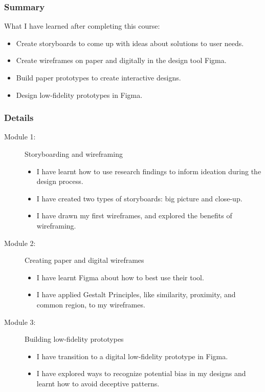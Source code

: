 \subsubsection{Summary}
\begin{flushleft}
	What I have learned after completing this course:
	\begin{itemize}
		\item Create storyboards to come up with ideas about solutions to user needs.
		\item Create wireframes on paper and digitally in the design tool Figma.
		\item Build paper prototypes to create interactive designs.
		\item Design low-fidelity prototypes in Figma.
	\end{itemize}
\end{flushleft}

\subsubsection{Details}
\begin{flushleft}
	\begin{description}
		\item[Module 1:] Storyboarding and wireframing
		      \begin{itemize}
			      \item I have learnt how to use research findings to inform ideation during the design process.
			      \item I have created two types of storyboards: big picture and close-up.
			      \item I have drawn my first wireframes, and explored the benefits of wireframing.
		      \end{itemize}
		\item[Module 2:] Creating paper and digital wireframes
		      \begin{itemize}
			      \item I have learnt Figma about how to best use their tool.
			      \item I have applied Gestalt Principles, like similarity, proximity, and common region, to my wireframes.
		      \end{itemize}
		\item[Module 3:] Building low-fidelity prototypes
		      \begin{itemize}
			      \item I have transition to a digital low-fidelity prototype in Figma.
			      \item I have explored ways to recognize potential bias in my designs and learnt how to avoid deceptive patterns.
		      \end{itemize}
	\end{description}
\end{flushleft}